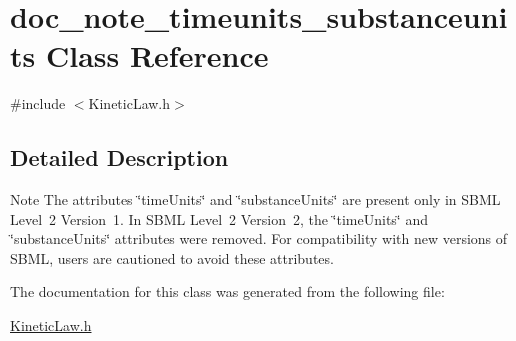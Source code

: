 \hypertarget{classdoc__note__timeunits__substanceunits}{}\section{doc\+\_\+note\+\_\+timeunits\+\_\+substanceunits Class Reference}
\label{classdoc__note__timeunits__substanceunits}


{\ttfamily \#include $<$Kinetic\+Law.\+h$>$}



\subsection{Detailed Description}
\begin{DoxyNote}{Note}
The attributes \char`\"{}time\+Units\char`\"{} and \char`\"{}substance\+Units\char`\"{} are present only in S\+B\+ML Level~2 Version~1. In S\+B\+ML Level~2 Version~2, the \char`\"{}time\+Units\char`\"{} and \char`\"{}substance\+Units\char`\"{} attributes were removed. For compatibility with new versions of S\+B\+ML, users are cautioned to avoid these attributes. 
\end{DoxyNote}


The documentation for this class was generated from the following file\+:\begin{DoxyCompactItemize}
\item 
\hyperlink{_kinetic_law_8h}{Kinetic\+Law.\+h}\end{DoxyCompactItemize}
